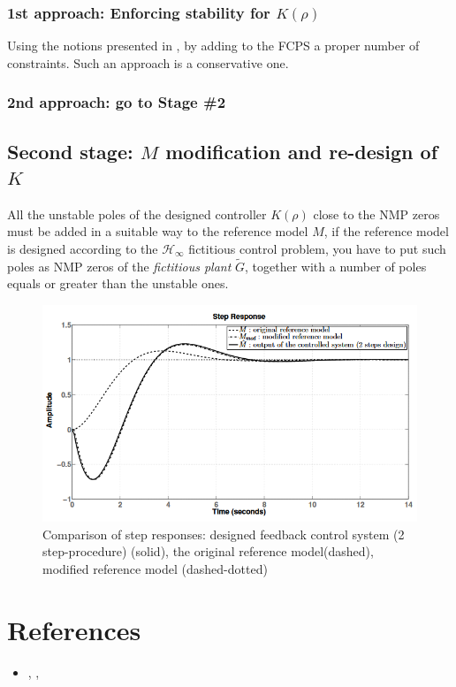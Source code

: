 \subsubsection{1st approach: Enforcing stability for $K(\rho)$}
Using the notions presented in , by adding to the FCPS a proper number of constraints. Such an approach is a conservative one. 
\subsubsection{2nd approach: go to Stage \#2}


\subsection{Second stage: $M$ modification and re-design of $K$}
All the unstable poles of the designed controller $K(\rho)$ close to the NMP zeros must be added in a suitable way to the reference model $M$, if the reference model is designed according to the $\mathcal{H}_\infty$ fictitious control problem, you have to put such poles as NMP zeros of the \textit{fictitious plant} $\tilde{G}$, together with a number of poles equals or greater than the unstable ones.

\begin{figure}[h]
    \centering 
    \includegraphics[scale=1]{img/NMP_1.png}
    \caption{Comparison of step responses: designed feedback control system (2 step-procedure) (solid), the original reference model(dashed), modified reference model (dashed-dotted)}
\end{figure}

\section*{References}
\begin{itemize}
    \item[\Large{\ding{45}}]  , \textit{}, 
\end{itemize}